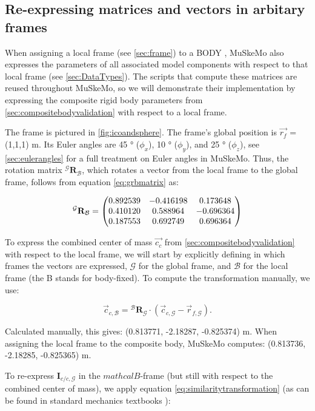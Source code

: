 \documentclass{article}
\begin{document}
\subsection{Re-expressing matrices and vectors in arbitary frames}
\label{sec:framevalidation}
When assigning a local frame (see \ref{sec:frame}) to a BODY , MuSkeMo also expresses the parameters of all associated model components with respect to that local frame (see \ref{sec:DataTypes}). The scripts that compute these matrices are reused throughout MuSkeMo, so we will demonstrate their implementation by expressing the composite rigid body parameters from \ref{sec:compositebodyvalidation} with respect to a local frame.

The frame is pictured in \ref{fig:icoandsphere}. The frame's global position is \(\vec{r_f}\) = (1,1,1) \si{m}. Its Euler angles are 45 \si{\degree} (\( \phi_x \)), 10 \si{\degree} (\( \phi_y \)), and 25 \si{\degree} (\( \phi_z \)), see \ref{sec:eulerangles} for a full treatment on Euler angles in MuSkeMo. Thus, the rotation matrix \({}^{\mathcal{G}} \mathbf{R}_{\mathcal{B}}\), which rotates a vector from the local frame to the global frame, follows from equation \ref{eq:grbmatrix} as:


\begin{equation}
    {}^{\mathcal{G}} \mathbf{R}_{\mathcal{B}} =
    \mqty(
    0.892539 & -0.416198 & 0.173648 \\
    0.410120 & 0.588964 & -0.696364 \\
    0.187553 & 0.692749 & 0.696364
    )
\end{equation}

To express the combined center of mass \(\vec{c_{c}}\) from \ref{sec:compositebodyvalidation} with respect to the local frame, we will start by explicitly defining in which frames the vectors are expressed, \(\mathcal{G}\) for the global frame, and \(\mathcal{B}\) for the local frame (the B stands for body-fixed). To compute the transformation manually, we use:

\begin{equation}
\vec{c}_{c,\mathcal{B}} = {}^{\mathcal{B}} \mathbf{R}_{\mathcal{G}} \cdot (\vec{c}_{c,\mathcal{G}} - \vec{r}_{f,\mathcal{G}}).
\end{equation}

Calculated manually, this gives: (0.813771, -2.18287, -0.825374) \si{m}. When assigning the local frame to the composite body, MuSkeMo computes: (0.813736, -2.18285, -0.825365) \si{m}. 

To re-express \(\mathbf{I}_{c/c,{\mathcal{G}}}\) in the \(mathcal{B}\)-frame (but still with respect to the combined center of mass), we apply equation \ref{eq:similaritytransformation} (as can be found in standard mechanics textbooks \cite{valleryAdvancedDynamics2019}):
\end{document}
